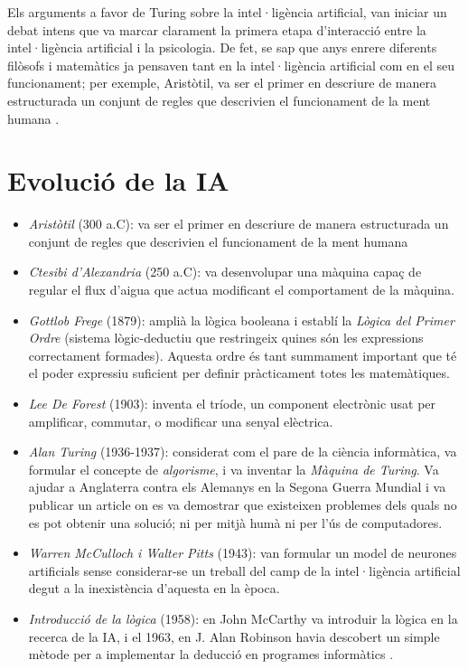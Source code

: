 Els arguments a favor de Turing sobre la intel·ligència artificial, van iniciar un debat intens que va marcar clarament la primera etapa d'interacció entre la intel·ligència artificial i la psicologia. De fet, se sap que anys enrere diferents filòsofs i matemàtics ja pensaven tant en la intel·ligència artificial com en el seu funcionament; per exemple, Aristòtil, va ser el primer en descriure de manera estructurada un conjunt de regles que descrivien el funcionament de la ment humana \cite{IAgen} \cite{IAgenII}.

\section{Evolució de la IA}
\begin{itemize}
\item  \emph{Aristòtil} (300 a.C): va ser el primer en descriure de manera estructurada un conjunt de regles que descrivien el funcionament de la ment humana
\item  \emph{Ctesibi d'Alexandria} (250 a.C): va desenvolupar una màquina capaç de regular el flux d'aigua que actua modificant el comportament de la màquina.
\item \emph{Gottlob Frege} (1879): amplià la lògica booleana i establí la \emph{Lògica del Primer Ordre} (sistema lògic-deductiu que restringeix quines són les expressions correctament formades). Aquesta ordre és tant summament important que té el poder expressiu suficient per definir pràcticament totes les matemàtiques.
\item \emph{Lee De Forest} (1903): inventa el tríode, un component electrònic usat per amplificar, commutar, o modificar una senyal elèctrica. \cite{Tri}
\item \emph{Alan Turing} (1936-1937): considerat com el pare de la ciència informàtica, va formular el concepte de \emph{algorisme}, i va inventar la \emph{Màquina de Turing}. Va ajudar a Anglaterra contra els Alemanys en la Segona Guerra Mundial i va publicar un article on es va demostrar que existeixen problemes dels quals no es pot obtenir una solució; ni per mitjà humà ni per l'ús de computadores.
\item \emph{Warren McCulloch i Walter Pitts} (1943): van formular un model de neurones artificials sense considerar-se un treball del camp de la intel·ligència artificial degut a la inexistència d'aquesta en la època.\cite{EvoIA}
\item \emph{Introducció de la lògica} (1958): en John McCarthy va introduir la lògica en la recerca de la IA, i el 1963, en J. Alan Robinson havia descobert un simple mètode per a implementar la deducció en programes informàtics \cite{machineswhothink}.

\end{itemize}

